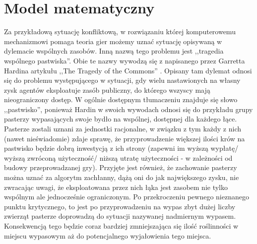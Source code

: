 \documentclass[12pt,a4paper]{article}
\begin{document}
\section{Model matematyczny}
Za przykładową  sytuację konfliktową, w rozwiązaniu której komputerowemu mechanizmowi pomaga teoria gier możemy uznać sytuację opisywaną w dylemacie wspólnych zasobów. Inną nazwą tego problemu jest ,,tragedia wspólnego pastwiska''. Obie te nazwy wywodzą się z napisanego przez Garretta Hardina artykułu ,,The Tragedy of the Commons'' \cite{hardin}. Opisany tam dylemat odnosi się do problemu występującego w sytuacji, gdy wielu nastawionych na własny zysk agentów eksploatuje zasób publiczny, do którego wszyscy mają nieograniczony dostęp. 
W ogólnie dostępnym tłumaczeniu znajduje się słowo ,,pastwisko'', ponieważ Hardin w swoich wywodach odnosi się do przykładu grupy pasterzy wypasających swoje bydło na wspólnej, dostępnej dla każdego łące. Pasterze zostali uznani za jednostki racjonalne, w związku z tym każdy z nich (nawet nieświadomie) zdaje sprawę, że przyprowadzenie większej ilości krów na pastwisko będzie dobrą inwestycją z ich strony (zapewni im wyższą wypłatę/ wyższą zwróconą użyteczność/ niższą utratę użyteczności - w zależności od budowy przeprowadzanej gry). Przyjęte jest również, że zachowanie pasterzy można uznać za algorytm zachłanny, dążą oni do jak największego zysku, nie zwracając uwagi, że eksploatowana przez nich łąka jest zasobem nie tylko wspólnym ale jednocześnie ograniczonym. Po przekroczeniu pewnego nieznanego punktu krytycznego, to jest po przyprowadzeniu na wypas zbyt dużej liczby zwierząt pasterze doprowadzą do sytuacji nazywanej nadmiernym wypasem. Konsekwencją tego będzie coraz bardziej zmniejszająca się ilość roślinności w miejscu wypasowym aż do potencjalnego wyjałowienia tego miejsca.\\
\end{document}
